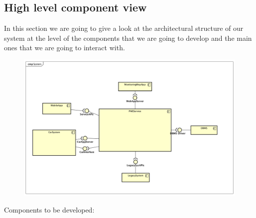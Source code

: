 \documentclass[]{article}
\begin{document}
\subsection{High level component view}\label{high-level-component-view}

In this section we are going to give a look at the architectural
structure of our system at the level of the components that we are going
to develop and the main ones that we are going to interact with.
\newline

\begin{figure}
\centering
\includegraphics[width=1.00000\textwidth,height=1.00000\textwidth]{./comp_diagrams/System.png}
\caption{}\label{id}
\end{figure}

Components to be developed:
\end{document}
